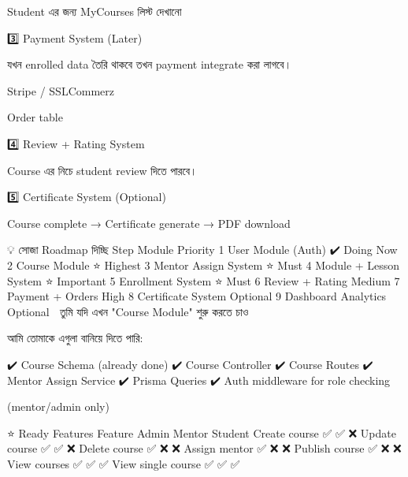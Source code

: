 Student এর জন্য MyCourses লিস্ট দেখানো

3️⃣ Payment System (Later)

যখন enrolled data তৈরি থাকবে তখন payment integrate করা লাগবে।

Stripe / SSLCommerz

Order table

4️⃣ Review + Rating System

Course এর নিচে student review দিতে পারবে।

5️⃣ Certificate System (Optional)

Course complete → Certificate generate → PDF download

💡 সোজা Roadmap দিচ্ছি
Step	Module	Priority
1	User Module (Auth)	✔️ Doing Now
2	Course Module	⭐ Highest
3	Mentor Assign System	⭐ Must
4	Module + Lesson System	⭐ Important
5	Enrollment System	⭐ Must
6	Review + Rating	Medium
7	Payment + Orders	High
8	Certificate System	Optional
9	Dashboard Analytics	Optional
📌 তুমি যদি এখন "Course Module" শুরু করতে চাও

আমি তোমাকে এগুলা বানিয়ে দিতে পারি:

✔️ Course Schema (already done)
✔️ Course Controller
✔️ Course Routes
✔️ Mentor Assign Service
✔️ Prisma Queries
✔️ Auth middleware for role checking

(mentor/admin only)











⭐ Ready Features
Feature	Admin	Mentor	Student
Create course	✅	✅	❌
Update course	✅	✅	❌
Delete course	✅	❌	❌
Assign mentor	✅	❌	❌
Publish course	✅	❌	❌
View courses	✅	✅	✅
View single course	✅	✅	✅